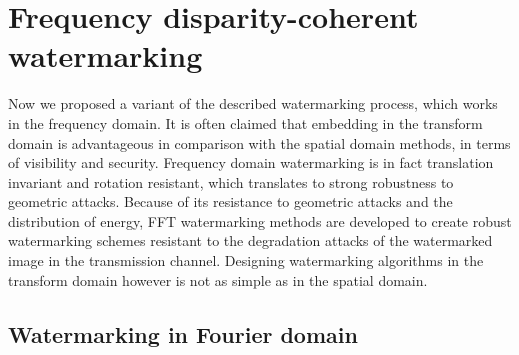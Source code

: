 \chapter{Frequency disparity-coherent watermarking}
\label{dft}

Now we proposed a variant of the described watermarking process, which works in the frequency domain. It is often claimed that embedding in the transform domain is advantageous in comparison with the spatial domain methods,
in terms of visibility and security. Frequency domain watermarking is in fact translation invariant and rotation resistant, which translates to strong robustness to geometric attacks. Because of its resistance to geometric attacks and the distribution of energy, FFT watermarking methods are developed to create robust watermarking schemes resistant to the degradation attacks of the watermarked image in the transmission channel.
Designing watermarking algorithms in the transform domain however is not as simple as in the spatial domain.  

\section{Watermarking in Fourier domain}

